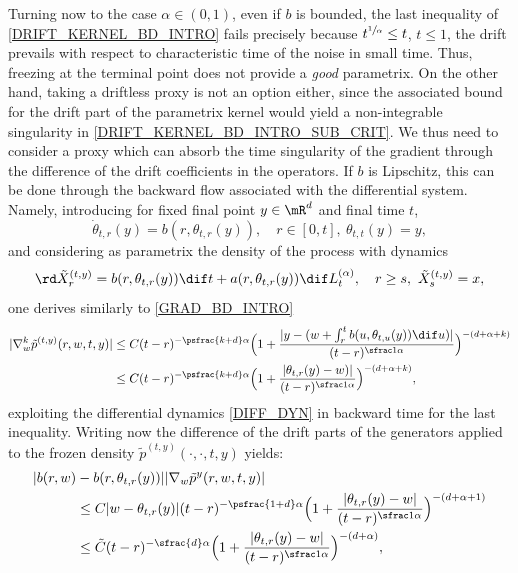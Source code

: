 {Turning now to the case $\alpha\in (0,1) $, even if $b$ is bounded, the last inequality of \eqref{DRIFT_KERNEL_BD_INTRO} fails precisely because $t^{\sfrac 1\alpha} \le t$, $t\le 1 $, \ie the drift prevails with respect to characteristic time of the noise in small time. Thus, freezing at the terminal point does not provide a \textit{good} parametrix. On the other hand, taking a driftless proxy is not an option either, since the associated bound for the drift part of the parametrix kernel would yield a non-integrable singularity in \eqref{DRIFT_KERNEL_BD_INTRO_SUB_CRIT}. We thus need to consider a proxy which can absorb the time singularity of the gradient through the difference of the drift coefficients in the operators. If $b$ is Lipschitz, this can \eg be done through the backward flow associated with the differential system. Namely,
introducing for fixed final point $y\in \mR^d$ and final time $t$,
\begin{equation}\label{DIFF_DYN}
\dot \theta_{t,r}(y)=b(r,\theta_{t,r}(y)),\quad r\in [0,t],\ \theta_{t,t}(y)=y,
\end{equation}
and considering as parametrix the density of the process with dynamics
\begin{equation}\label{PROXY_2}
\rd \tilde X_r^{(t,y)}=b(r,\theta_{t,r}(y))\dif t+a(r,\theta_{t,r}(y))\dif L^{(\alpha)}_t,\quad r\ge s,\ \tilde X_s^{(t,y)}=x,
\end{equation}
one derives similarly to \eqref{GRAD_BD_INTRO}
\begin{align*}%
|\nabla_w^k \tilde p^{(t,y)}(r,w,t,y)|&\le C (t-r)^{-\psfrac{k+d}\alpha}\Bigl(1+\frac{|y-(w+\int_r^t b(u,\theta_{t,u}(y))\dif u)|}{(t-r)^{\sfrac 1\alpha}}\Bigr)^{-(d+\alpha+k)}\\
&\le  C (t-r)^{-\psfrac{k+d}\alpha}\Bigl(1+\frac{|\theta_{t,r}(y)-w)|}{(t-r)^{\sfrac 1\alpha}}\Bigr)^{-(d+\alpha+k)},
\end{align*}
exploiting the differential dynamics \eqref{DIFF_DYN} in backward time for the last inequality.
Writing now the difference of the drift parts of the generators applied to the frozen density $\tilde p^{(t,y)}(\cdot,\cdot,t,y)$ yields:
\begin{align*}
|b(r,w)&-b(r,\theta_{t,r}(y))||\nabla_w \tilde p^y(r,w,t,y)|\\
&\le  C |w-\theta_{t,r}(y)|(t-r)^{-\psfrac{1+d}\alpha}\Bigl(1+\frac{|\theta_{t,r}(y)-w|}{(t-r)^{\sfrac 1\alpha}}\Bigr)^{-(d+\alpha+1)}\\
&\le  \tilde C (t-r)^{-\sfrac{d}\alpha}\Bigl(1+\frac{|\theta_{t,r}(y)-w|}{(t-r)^{\sfrac 1\alpha}}\Bigr)^{-(d+\alpha)},

\end{align*}}
